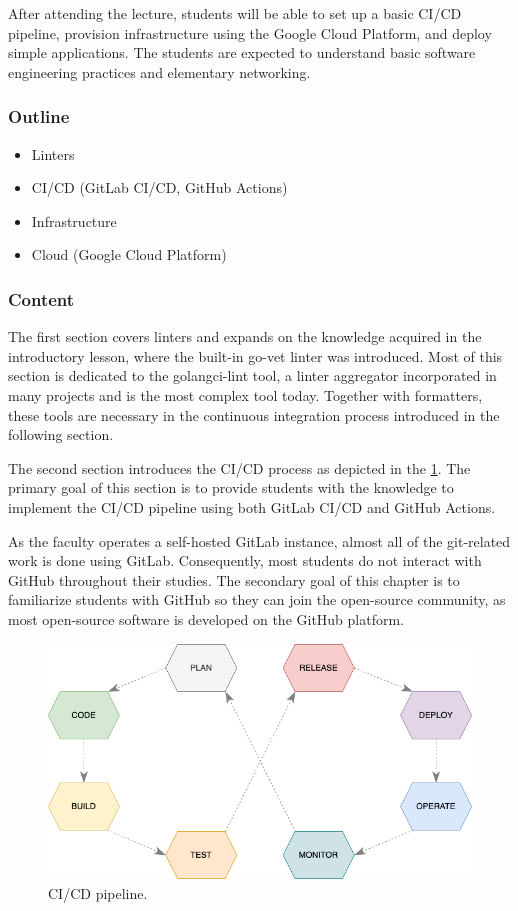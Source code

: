 \documentclass[
  digital,
  color,
  oneside,
  nosansbold,
  nocolorbold,
  nolof,
  nolot,
]{fithesis4}
\begin{document}
After attending the lecture, students will be able to set up a basic CI/CD pipeline, provision infrastructure using the Google Cloud Platform, and deploy simple applications. The students are expected to understand basic software engineering practices and elementary networking.

\subsubsection{Outline}

\begin{itemize}
    \item Linters
    \item CI/CD (GitLab CI/CD, GitHub Actions)
    \item Infrastructure
    \item Cloud (Google Cloud Platform)
\end{itemize}

\subsubsection{Content}

The first section covers linters and expands on the knowledge acquired in the introductory lesson, where the built-in go-vet linter was introduced. Most of this section is dedicated to the golangci-lint tool, a linter aggregator incorporated in many projects and is the most complex tool today. Together with formatters, these tools are necessary in the continuous integration process introduced in the following section.

The second section introduces the CI/CD process as depicted in the \cref{fig:cicd}. The primary goal of this section is to provide students with the knowledge to implement the CI/CD pipeline using both GitLab CI/CD\cite{gitlab-cicd} and GitHub Actions\cite{github-actions}.

As the faculty operates a self-hosted GitLab instance, almost all of the git-related work is done using GitLab. Consequently, most students do not interact with GitHub throughout their studies. The secondary goal of this chapter is to familiarize students with GitHub so they can join the open-source community, as most open-source software is developed on the GitHub platform.

\begin{figure}[H]
    \centering
    \includegraphics[width=12cm]{figures/cicd.png}
    \caption{CI/CD pipeline.}
    \label{fig:cicd}
\end{figure}
\end{document}
